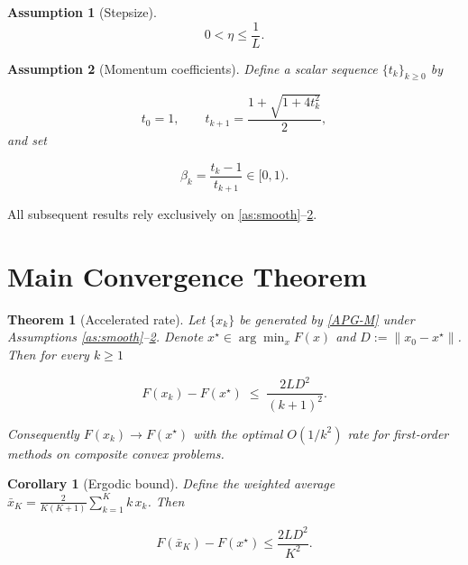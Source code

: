 \documentclass{article}
\newtheorem{theorem}{Theorem}
\newtheorem{assumption}{Assumption}
\newtheorem{corollary}{Corollary}
\begin{document}
\begin{assumption}[Stepsize]\label{as:stepsize}
\[
0<\eta\le\frac{1}{L}.
\tag{A3}
\]
\end{assumption}

\begin{assumption}[Momentum coefficients]\label{as:beta}
Define a scalar sequence $\{t_{k}\}_{k\ge0}$ by  

\[
t_{0}=1,\qquad t_{k+1}= \frac{1+\sqrt{1+4t_{k}^{2}}}{2},
\tag{A4}
\]
and set  

\[
\beta_{k}= \frac{t_{k}-1}{t_{k+1}}\in[0,1).
\tag{A5}
\]
\end{assumption}

All subsequent results rely exclusively on \ref{as:smooth}--\ref{as:beta}.

\section*{Main Convergence Theorem}
\begin{theorem}[Accelerated rate]\label{thm:rate}
Let $\{x_{k}\}$ be generated by \eqref{APG-M} under Assumptions
\ref{as:smooth}–\ref{as:beta}.  
Denote $x^{\star}\in\arg\min_{x}F(x)$ and $D:=\|x_{0}-x^{\star}\|$.  
Then for every $k\ge1$  

\[
F(x_{k})-F(x^{\star})\;\le\;\frac{2L D^{2}}{(k+1)^{2}} .
\tag{T1}
\]

Consequently $F(x_{k})\to F(x^{\star})$ with the optimal $O(1/k^{2})$ rate for
first‑order methods on composite convex problems.
\end{theorem}

\begin{corollary}[Ergodic bound]
Define the weighted average $\bar x_{K}= \frac{2}{K(K+1)}\sum_{k=1}^{K}k\,x_{k}$.  
Then  

\[
F(\bar x_{K})-F(x^{\star})\le \frac{2L D^{2}}{K^{2}} .
\tag{C1}
\]
\end{corollary}

\end{document}
